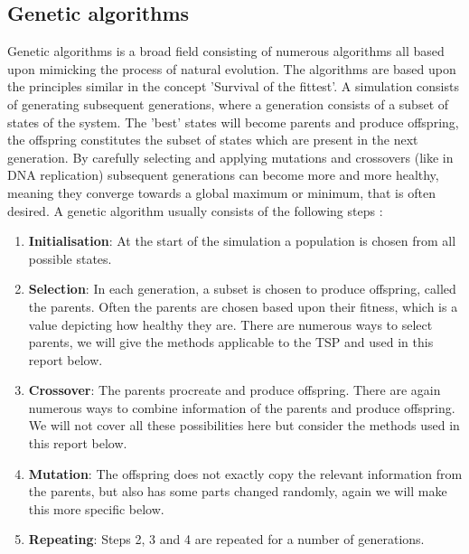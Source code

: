 \documentclass[10pt,a4paper]{article}
\begin{document}
\subsection{Genetic algorithms}
Genetic algorithms is a broad field consisting of numerous algorithms all based upon mimicking the process of natural evolution. The algorithms are based upon the principles similar in the concept 'Survival of the fittest'. A simulation consists of generating subsequent generations, where a generation consists of a subset of states of the system. The 'best' states will become parents and produce offspring, the offspring constitutes the subset of states which are present in the next generation. By carefully selecting and applying mutations and crossovers (like in DNA replication) subsequent generations can become more and more healthy, meaning they converge towards a global maximum or minimum, that is often desired. A genetic algorithm usually consists of the following steps \cite{wiki}:
\begin{enumerate}
\item 
  \textbf{Initialisation}: At the start of the simulation a population is chosen from all possible states.
\item
  \textbf{Selection}: In each generation, a subset is chosen to produce offspring, called the parents. Often the parents are chosen based upon their fitness, which is a value depicting how healthy they are. There are numerous ways to select parents, we will give the methods applicable to the TSP and used in this report below.
\item
  \textbf{Crossover}: The parents procreate and produce offspring. There are again numerous ways to combine information of the parents and produce offspring. We will not cover all these possibilities here but consider the methods used in this report below.
\item
  \textbf{Mutation}: The offspring does not exactly copy the relevant information from the parents, but also has some parts changed randomly, again we will make this more specific below.
\item  
  \textbf{Repeating}: Steps 2, 3 and 4 are repeated for a number of generations.
\end{enumerate}
\end{document}
